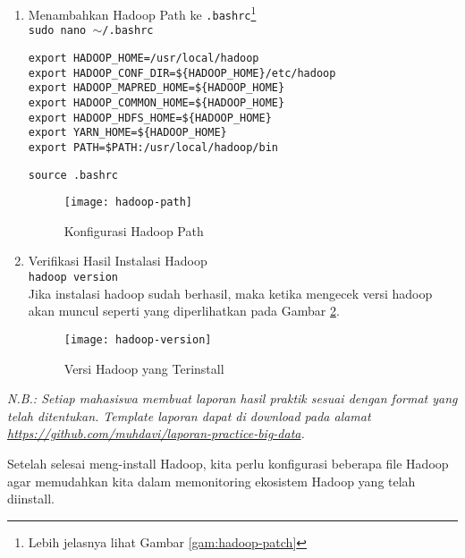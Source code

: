 \documentclass[a4paper]{tufte-handout}
\begin{document}
\begin{enumerate}
\item Menambahkan Hadoop Path ke {\tt .bashrc}\footnote{Lebih jelasnya lihat Gambar \ref{gam:hadoop-patch}} \\
{\tt sudo nano $\sim$/.bashrc} \\
\begin{lstlisting}
export HADOOP_HOME=/usr/local/hadoop
export HADOOP_CONF_DIR=${HADOOP_HOME}/etc/hadoop
export HADOOP_MAPRED_HOME=${HADOOP_HOME}
export HADOOP_COMMON_HOME=${HADOOP_HOME}
export HADOOP_HDFS_HOME=${HADOOP_HOME}
export YARN_HOME=${HADOOP_HOME}
export PATH=$PATH:/usr/local/hadoop/bin
\end{lstlisting}
{\tt source .bashrc}
\begin{figure}[!ht]
\centering
\texttt{[image: hadoop-path]}
\caption{Konfigurasi Hadoop Path}
\label{gam:hadoop-path}
\end{figure}

\item Verifikasi Hasil Instalasi Hadoop \\
{\tt hadoop version} \\
Jika instalasi hadoop sudah berhasil, maka ketika mengecek versi hadoop akan muncul seperti yang diperlihatkan pada Gambar \ref{gam:hadoop-version}.
\begin{figure}[!ht]
\texttt{[image: hadoop-version]}
\caption{Versi Hadoop yang Terinstall}
\label{gam:hadoop-version}
\end{figure}
\end{enumerate}
 
\hrulefill

\clearpage
{}
\textit{N.B.: Setiap mahasiswa membuat laporan hasil praktik sesuai dengan format yang telah ditentukan. Template laporan dapat di download pada alamat \url{https://github.com/muhdavi/laporan-practice-big-data}.}


Setelah selesai meng-install Hadoop, kita perlu konfigurasi beberapa file Hadoop agar memudahkan kita dalam memonitoring ekosistem Hadoop yang telah diinstall.
\end{document}
